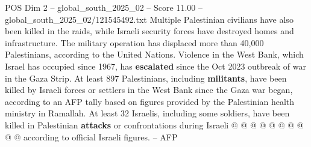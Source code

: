 \begin{textsample}{POS Dim 2 – global\_south\_2025\_02 – Score 11.00 – global\_south\_2025\_02/121545492.txt}
Multiple Palestinian civilians have also been killed in the raids, while Israeli security forces have destroyed homes and infrastructure.
The military operation has displaced more than 40,000 Palestinians, according to the United Nations.
Violence in the West Bank, which Israel has occupied since 1967, has \textbf{escalated} since the Oct 2023 outbreak of war in the Gaza Strip.
At least 897 Palestinians, including \textbf{militants}, have been killed by Israeli forces or settlers in the West Bank since the Gaza war began, according to an AFP tally based on figures provided by the Palestinian health ministry in Ramallah.
At least 32 Israelis, including some soldiers, have been killed in Palestinian \textbf{attacks} or confrontations during Israeli @ @ @ @ @ @ @ @ @ @ according to official Israeli figures. -- AFP

\end{textsample}
